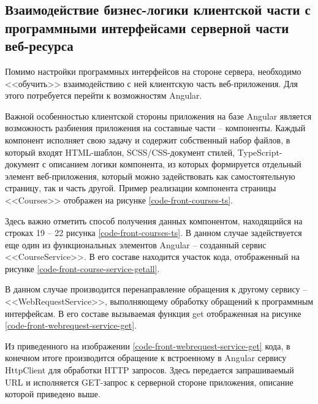 \subsection{Взаимодействие бизнес-логики клиентской части с программными интерфейсами серверной части веб-ресурса}

Помимо настройки программных интерфейсов на стороне сервера, необходимо <<обучить>> взаимодействию с ней клиентскую часть веб-приложения.
Для этого потребуется перейти к возможностям Angular.

Важной особенностью клиентской стороны приложения на базе Angular является возможность разбиения приложения на составные части -- компоненты.
Каждый компонент исполняет свою задачу и содержит собственный набор файлов, в который входят HTML-шаблон, SCSS/CSS-документ стилей, TypeScript-документ с описанием логики компонента, из которых формируется отдельный элемент веб-приложения, который можно задействовать как самостоятельную страницу, так и часть другой.
Пример реализации компонента страницы <<Courses>> отображен на рисунке \ref{code-front-courses-ts}.


Здесь важно отметить способ получения данных компонентом, находящийся на строках 19 -- 22 рисунка \ref{code-front-courses-ts}.
В данном случае задействуется еще один из функциональных элементов Angular -- созданный сервис <<CourseService>>.
В его составе находится участок кода, отображенный на рисунке \ref{code-front-course-service-getall}.


В данном случае производится перенаправление обращения к другому сервису -- <<WebRequestService>>, выполняющему обработку обращений к программным интерфейсам.
В его составе вызываемая функция get отображенная на рисунке \ref{code-front-webrequest-service-get}.


Из приведенного на изображении \ref{code-front-webrequest-service-get} кода, в конечном итоге производится обращение к встроенному в Angular сервису HttpClient для обработки HTTP запросов.
Здесь передается запрашиваемый URL и исполняется GET-запрос к серверной стороне приложения, описание которой приведено выше.

